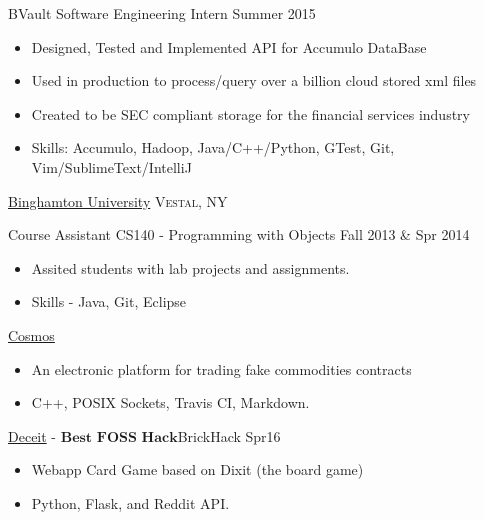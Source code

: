 \documentclass[11pt]{article}
\begin{document}
\headedsection  %
{}
{} {
    \headedsubsection
    {BVault Software Engineering Intern}
    {Summer 2015}
    {
        \begin{itemize}
            \item Designed, Tested and Implemented API for Accumulo DataBase
            \item Used in production to process/query over a billion cloud stored xml files
            \item Created to be SEC compliant storage for the financial services industry
            \item Skills: Accumulo, Hadoop, Java/C++/Python, GTest, Git, Vim/SublimeText/IntelliJ
        \end{itemize}
    }
}

\headedsection
{\href{}{Binghamton University}}
{\textsc{Vestal, NY}} {
    \headedsubsection
    {Course Assistant CS140 - Programming with Objects}
    {Fall 2013 \& Spr 2014}
    {
        \begin{itemize}
            \item Assited students with lab projects and assignments.
            \item Skills - Java, Git, Eclipse
        \end{itemize}
    }
}


\spacedhrule{0.1em}{0.5em}  %


\projects
{{\href{https://github.com/gabeochoa/Cosmos}{Cosmos}}}{}
{
    \begin{itemize}[label={}]
        \setlength\itemsep{.005ex}
        \item{An electronic platform for trading fake commodities contracts}
        \item{C++, POSIX Sockets, Travis CI, Markdown.}
    \end{itemize}
}

\projects
{{\href{https://github.com/gabeochoa/sokim}{Deceit}} - $\textbf{Best FOSS Hack}$}{BrickHack Spr16}
{
    \begin{itemize}[label={}]
        \setlength\itemsep{.005ex}
        \item{Webapp Card Game based on Dixit (the board game)}
        \item{Python, Flask, and Reddit API.}
    \end{itemize}
}
\end{document}
